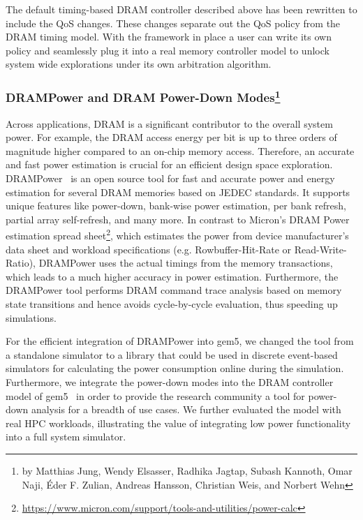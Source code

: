 The default timing-based DRAM controller described above has been rewritten to include the QoS changes.
These changes separate out the QoS policy from the DRAM timing model.
With the framework in place a user can write its own policy and seamlessly plug it into a real memory controller model to unlock system wide explorations under its own arbitration algorithm.

\subsubsection[DRAMPower and DRAM Power-Down Modes]{DRAMPower and DRAM Power-Down Modes\footnote{by Matthias Jung, Wendy Elsasser, Radhika Jagtap, Subash Kannoth, Omar Naji, Éder F.
Zulian, Andreas Hansson, Christian Weis, and Norbert Wehn }}
%
Across applications, DRAM is a significant contributor to the overall system power.
For example, the DRAM access energy per bit is up to three orders of magnitude higher compared to an on-chip memory access.
Therefore, an accurate and fast power estimation is crucial for an efficient design space exploration.
DRAMPower~\cite{kargoo_14} is an open source tool for fast and accurate power and energy estimation for several DRAM memories based on JEDEC standards.
It supports unique features like power-down, bank-wise power estimation, per bank refresh, partial array self-refresh, and many more.
In contrast to Micron's DRAM Power estimation spread sheet\footnote{\url{https://www.micron.com/support/tools-and-utilities/power-calc}}, which estimates the power from device manufacturer's data sheet and workload specifications (e.g. Rowbuffer-Hit-Rate or Read-Write-Ratio), DRAMPower uses the actual timings from the memory transactions, which leads to a much higher accuracy in power estimation.
Furthermore, the DRAMPower tool performs DRAM command trace analysis based on memory state transitions and hence avoids cycle-by-cycle evaluation, thus speeding up simulations.

For the efficient integration of DRAMPower into gem5, we changed the tool from a standalone simulator to a library that could be used in discrete event-based simulators for calculating the power consumption online during the simulation.
Furthermore, we integrate the power-down modes into the DRAM controller model of gem5~\cite{jagjun_17} in order to provide the research community a tool for power-down analysis for a breadth of use cases. We further evaluated the model with real HPC workloads, illustrating the value of integrating low power functionality into a full system simulator.
%
